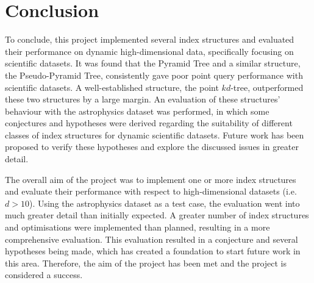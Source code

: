 \section{Conclusion}

To conclude, this project implemented several index structures and evaluated their performance on dynamic high-dimensional data, specifically focusing on scientific datasets. It was found that the Pyramid Tree and a similar structure, the Pseudo-Pyramid Tree, consistently gave poor point query performance with scientific datasets. A well-established structure, the point $kd$-tree, outperformed these two structures by a large margin. An evaluation of these structures' behaviour with the astrophysics dataset was performed, in which some conjectures and hypotheses were derived regarding the suitability of different classes of index structures for dynamic scientific datasets. Future work has been proposed to verify these hypotheses and explore the discussed issues in greater detail.

The overall aim of the project was to implement one or more index structures and evaluate their performance with respect to high-dimensional datasets (i.e. $d > 10$). Using the astrophysics dataset as a test case, the evaluation went into much greater detail than initially expected. A greater number of index structures and optimisations were implemented than planned, resulting in a more comprehensive evaluation. This evaluation resulted in a conjecture and several hypotheses being made, which has created a foundation to start future work in this area. Therefore, the aim of the project has been met and the project is considered a success.